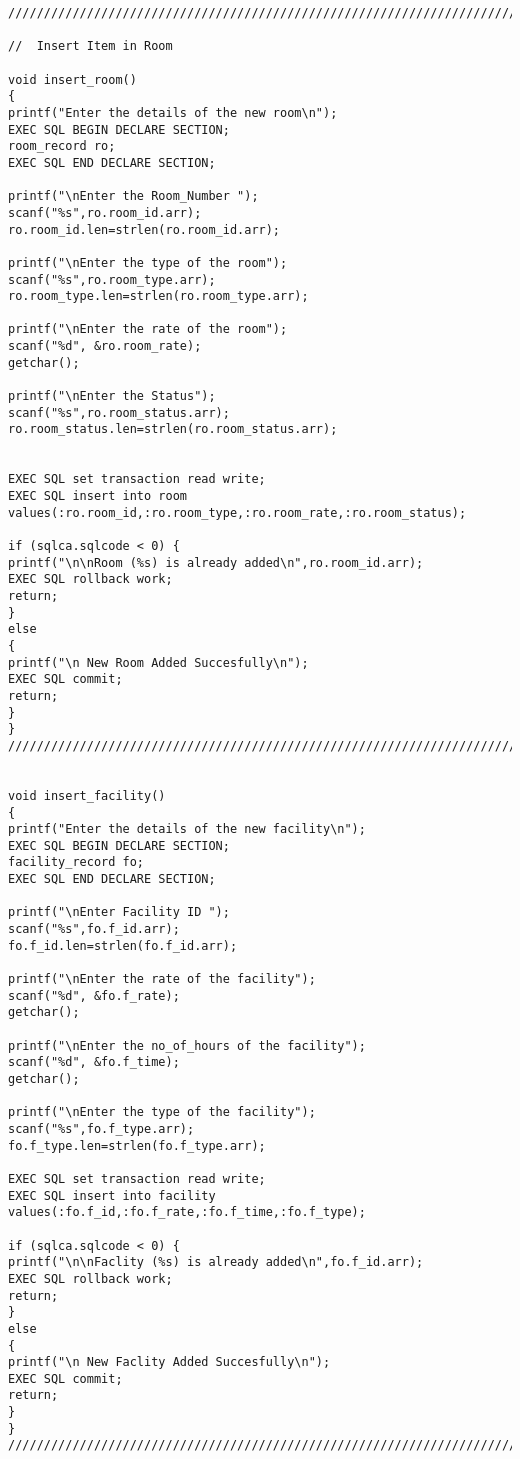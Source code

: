 \documentclass[a4,12pt]{report}
\begin{document}
\begin{lstlisting}
////////////////////////////////////////////////////////////////////////////////////////////////////////////////////////////////////////////

//  Insert Item in Room

void insert_room()
{
printf("Enter the details of the new room\n");
EXEC SQL BEGIN DECLARE SECTION;
room_record ro;
EXEC SQL END DECLARE SECTION;

printf("\nEnter the Room_Number ");
scanf("%s",ro.room_id.arr);
ro.room_id.len=strlen(ro.room_id.arr);

printf("\nEnter the type of the room");
scanf("%s",ro.room_type.arr);
ro.room_type.len=strlen(ro.room_type.arr);

printf("\nEnter the rate of the room");
scanf("%d", &ro.room_rate);
getchar();

printf("\nEnter the Status");
scanf("%s",ro.room_status.arr);
ro.room_status.len=strlen(ro.room_status.arr);


EXEC SQL set transaction read write;
EXEC SQL insert into room values(:ro.room_id,:ro.room_type,:ro.room_rate,:ro.room_status);

if (sqlca.sqlcode < 0) {
printf("\n\nRoom (%s) is already added\n",ro.room_id.arr);
EXEC SQL rollback work;
return;
}
else 
{
printf("\n New Room Added Succesfully\n");
EXEC SQL commit;
return;
} 
}
////////////////////////////////////////////////////////////////////////////////////////////////////////////////////////////////////////


void insert_facility()
{
printf("Enter the details of the new facility\n");
EXEC SQL BEGIN DECLARE SECTION;
facility_record fo;
EXEC SQL END DECLARE SECTION;

printf("\nEnter Facility ID ");
scanf("%s",fo.f_id.arr);
fo.f_id.len=strlen(fo.f_id.arr);

printf("\nEnter the rate of the facility");
scanf("%d", &fo.f_rate);
getchar();

printf("\nEnter the no_of_hours of the facility");
scanf("%d", &fo.f_time);
getchar();

printf("\nEnter the type of the facility");
scanf("%s",fo.f_type.arr);
fo.f_type.len=strlen(fo.f_type.arr);

EXEC SQL set transaction read write;
EXEC SQL insert into facility values(:fo.f_id,:fo.f_rate,:fo.f_time,:fo.f_type);

if (sqlca.sqlcode < 0) {
printf("\n\nFaclity (%s) is already added\n",fo.f_id.arr);
EXEC SQL rollback work;
return;
}
else 
{
printf("\n New Faclity Added Succesfully\n");
EXEC SQL commit;
return;
} 
}
///////////////////////////////////////////////////////////////////////////////////////////////////////////////////////////////////////////


\end{lstlisting}
\end{document}
